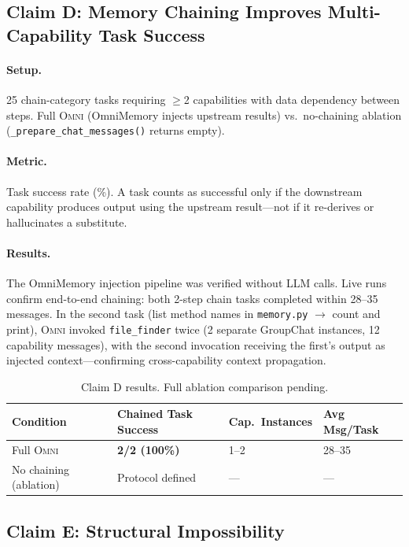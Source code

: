 \documentclass[11pt,a4paper]{article}
\newcommand{\omni}{\textsc{Omni}}
\begin{document}
\subsection{Claim D: Memory Chaining Improves Multi-Capability Task Success}
\label{sec:claim_d}

\paragraph{Setup.} 25 chain-category tasks requiring $\geq$2 capabilities with data dependency between steps. Full \omni{} (OmniMemory injects upstream results) vs.\ no-chaining ablation (\texttt{\_prepare\_chat\_messages()} returns empty).

\paragraph{Metric.} Task success rate (\%). A task counts as successful only if the downstream capability produces output using the upstream result---not if it re-derives or hallucinates a substitute.

\paragraph{Results.} The OmniMemory injection pipeline was verified without LLM calls. Live runs confirm end-to-end chaining: both 2-step chain tasks completed within 28--35 messages. In the second task (list method names in \texttt{memory.py} $\to$ count and print), \omni{} invoked \texttt{file\_finder} twice (2 separate GroupChat instances, 12 capability messages), with the second invocation receiving the first's output as injected context---confirming cross-capability context propagation.

\begin{table}[h]
\centering
\caption{Claim D results. Full ablation comparison pending.}
\label{tab:claim_d}
\small
\begin{tabular}{llll}
\toprule
\textbf{Condition} & \textbf{Chained Task Success} & \textbf{Cap.\ Instances} & \textbf{Avg Msg/Task} \\
\midrule
Full \omni{} & \textbf{2/2 (100\%)} & 1--2 & 28--35 \\
No chaining (ablation) & Protocol defined & --- & --- \\
\bottomrule
\end{tabular}
\end{table}

\subsection{Claim E: Structural Impossibility}
\label{sec:claim_e}
\end{document}
